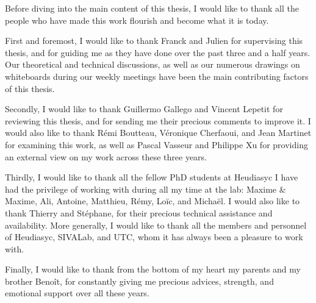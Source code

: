 \cleardoublepage{}
\begin{acknowledgement}
  Before diving into the main content of this thesis, I would like to thank all the people who have made this work flourish and become what it is today.

  First and foremost, I would like to thank Franck and Julien for supervising this thesis, and for guiding me as they have done over the past three and a half years. Our theoretical and technical discussions, as well as our numerous drawings on whiteboards during our weekly meetings have been the main contributing factors of this thesis.

  Secondly, I would like to thank Guillermo Gallego and Vincent Lepetit for reviewing this thesis, and for sending me their precious comments to improve it. I would also like to thank Rémi Boutteau, Véronique Cherfaoui, and Jean Martinet for examining this work, as well as Pascal Vasseur and Philippe Xu for providing an external view on my work across these three years.

  Thirdly, I would like to thank all the fellow PhD students at Heudiasyc I have had the privilege of working with during all my time at the lab: Maxime \& Maxime, Ali, Antoine, Matthieu, Rémy, Loïc, and Michaël. I would also like to thank Thierry and Stéphane, for their precious technical assistance and availability. More generally, I would like to thank all the members and personnel of Heudiasyc, SIVALab, and UTC, whom it has always been a pleasure to work with.

  Finally, I would like to thank from the bottom of my heart my parents and my brother Benoît, for constantly giving me precious advices, strength, and emotional support over all these years.
\end{acknowledgement}
